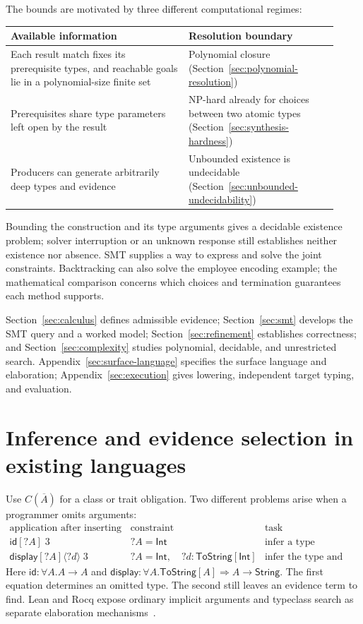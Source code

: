 \documentclass[10pt,a4paper]{article}
\newcommand{\Int}{\mathsf{Int}}
\newcommand{\Str}{\mathsf{String}}
\newcommand{\TS}{\mathsf{ToString}}
\newcommand{\iarg}[1]{\langle#1\rangle}
\newcommand{\kw}[1]{\mathsf{#1}}
\begin{document}
The bounds are motivated by three different computational regimes:
\begin{center}
\begin{tabular}{@{}
 >{\raggedright\arraybackslash}p{0.50\linewidth}
 >{\raggedright\arraybackslash}p{0.42\linewidth}@{}}
\toprule
Available information & Resolution boundary\\
\midrule
Each result match fixes its prerequisite types, and reachable goals lie in
a polynomial-size finite set
 & Polynomial closure (Section~\ref{sec:polynomial-resolution})\\[5pt]
Prerequisites share type parameters left open by the result
 & NP-hard already for choices between two atomic types
   (Section~\ref{sec:synthesis-hardness})\\[5pt]
Producers can generate arbitrarily deep types and evidence
 & Unbounded existence is undecidable
   (Section~\ref{sec:unbounded-undecidability})\\
\bottomrule
\end{tabular}
\end{center}
Bounding the construction and its type arguments gives a decidable existence problem;
solver interruption
or an \textsf{unknown} response still establishes neither existence nor absence.
SMT supplies a way to express and solve the joint constraints. Backtracking can
also solve the employee encoding example; the mathematical comparison concerns which
choices and termination guarantees each method supports.

Section~\ref{sec:calculus} defines admissible evidence;
Section~\ref{sec:smt} develops the SMT query and a worked model;
Section~\ref{sec:refinement} establishes correctness; and
Section~\ref{sec:complexity} studies polynomial, decidable, and unrestricted search.
Appendix~\ref{sec:surface-language} specifies the surface language and elaboration;
Appendix~\ref{sec:execution} gives lowering, independent target typing, and evaluation.

\newpage
\section{Inference and evidence selection in existing languages}
\label{sec:existing-languages}
Use $C(\overline A)$ for a class or trait obligation. Two different problems arise
when a programmer omits arguments:
\[
\begin{array}{c|c|c}
 \text{application after inserting unknowns} & \text{constraint} & \text{task}\\ \hline
 \kw{id}[?A]\;3
   & ?A=\Int & \text{infer a type argument}\\[3pt]
 \kw{display}[?A]\iarg{?d}\;3
   & ?A=\Int,\quad ?d:\TS[\Int] & \text{infer the type and construct evidence}
\end{array}
\]
Here $\kw{id}:\forall A.A\to A$ and
$\kw{display}:\forall A.\TS[A]\Rightarrow A\to\Str$.
The first equation determines an omitted type. The second still leaves an evidence
term to find. Lean and Rocq expose ordinary implicit arguments and typeclass search
as separate elaboration mechanisms~\cite{lean-functions,rocq-implicit}.
\end{document}
